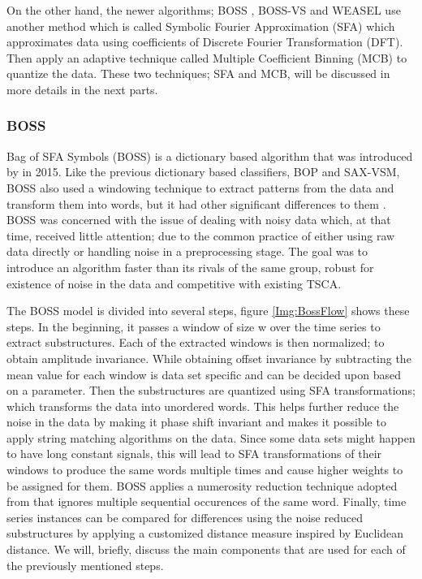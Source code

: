On the other hand, the newer algorithms; BOSS \cite{schafer2015boss}, BOSS-VS \cite{schafer2016scalable} and WEASEL \cite{schafer2017fast}
use another method which is called Symbolic Fourier Approximation (SFA) which approximates data using coefficients of Discrete Fourier Transformation (DFT).
Then apply an adaptive technique called Multiple Coefficient Binning (MCB) to quantize the data.
These two techniques; SFA and MCB, will be discussed in more details in the next parts.

\subsubsection{BOSS}
\label{SubsubsectionBOSS}
Bag of SFA Symbols (BOSS) is a dictionary based algorithm that was introduced by \cite{schafer2015boss} in 2015.
Like the previous dictionary based classifiers, BOP and SAX-VSM,
BOSS also used a windowing technique to extract patterns from the data and transform them into words, but it had other significant differences to them \cite{bagnall2017great}.
BOSS was concerned with the issue of dealing with noisy data which, at that time, received little attention; due to the common practice of
either using raw data directly or handling noise in a preprocessing stage. The goal was to introduce an algorithm faster than its rivals of the same group,
robust for existence of noise in the data and competitive with existing TSCA.

The BOSS model is divided into several steps, figure \ref{Img:BossFlow} shows these steps.
In the beginning, it passes a window of size w over the time series to extract substructures.
Each of the extracted windows is then normalized; to obtain amplitude invariance.
While obtaining offset invariance by subtracting the mean value for each window is data set specific and can be decided upon based on a parameter.
Then the substructures are quantized using SFA transformations; which transforms the data into unordered words.
This helps further reduce the noise in the data by making it phase shift invariant and makes it possible to apply string matching algorithms on the data.
Since some data sets might happen to have long constant signals, this will lead to SFA transformations of their windows to produce the same words multiple times
and cause higher weights to be assigned for them. BOSS applies a numerosity reduction technique adopted from \cite{lin2007experiencing,lin2012rotation}
that ignores multiple sequential occurences of the same word.
Finally, time series instances can be compared for differences using the noise reduced substructures by applying a customized distance measure inspired by Euclidean distance.
We will, briefly, discuss the main components that are used for each of the previously mentioned steps.

